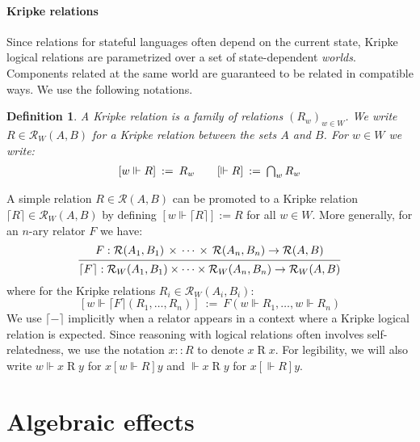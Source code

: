 \documentclass[draft,11pt]{report}
\newtheorem{definition}{Definition}
\newcommand{\ifr}[1]{\mathrel{[{#1}]}}
\begin{document}
\paragraph{Kripke relations}

Since relations for stateful languages
often depend on the current state,
Kripke logical relations
are parametrized over a set of state-dependent \emph{worlds}.
Components related at the same world
are guaranteed to be related in compatible ways.
We use the following notations.

\begin{definition} \label{def:klr} %
A \emph{Kripke} relation is
a family of relations $(R_w)_{w \in W}$.
We write $R \in \mathcal{R}_W(A, B)$
for a Kripke relation between the sets $A$ and $B$.
For $w \in W$ we write:
\[
\begin{array}{c@{\qquad}c}
    [w \Vdash R] \: := \: R_w &
    [\Vdash R] \: := \: \bigcap_{w} R_w
\end{array}
\]
\end{definition}

A simple relation $R \in \mathcal{R}(A, B)$
can be promoted to a Kripke relation
$\lceil R \rceil \in \mathcal{R}_W(A, B)$
by defining $[w \Vdash \lceil R \rceil] := R$ for all $w \in W$.
More generally, for an $n$-ary relator $F$ we have:
\[
  \begin{prooftree}
  \hypo{
    F :
      \mathcal{R}(A_1, B_1) \,\times\,\cdots\,\times\,\mathcal{R}(A_n, B_n)
      \rightarrow \mathcal{R}(A, B)}
  \infer1{
    \lceil F \rceil :
      \mathcal{R}_W(A_1, B_1) \times \cdots \times \mathcal{R}_W(A_n, B_n)
      \rightarrow \mathcal{R}_W(A, B)}
  \end{prooftree}
\]
where for the Kripke relations $R_i \in \mathcal{R}_W(A_i, B_i)$:
\[
  [w \Vdash \lceil F \rceil (R_1, \ldots, R_n)] \: := \:
    F(w \Vdash R_1, \ldots, w \Vdash R_n)
\]
We use $\lceil - \rceil$ implicitly
when a relator appears in a context where
a Kripke logical relation is expected.
Since reasoning with logical relations
often involves self-relatedness,
we use the notation
$x :: R$ to denote $x \mathrel{R} x$.
For legibility, we will also write
$w \Vdash x \mathrel{R} y$ for $x \ifr{w \Vdash R} y$
and $\Vdash x \mathrel{R} y$ for $x \ifr{\Vdash R} y$.



\section{Algebraic effects} %
\end{document}
